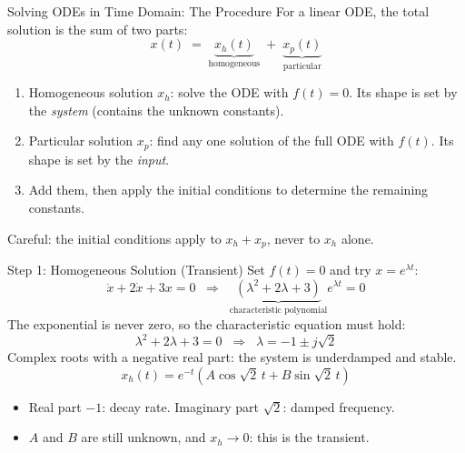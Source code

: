 \documentclass[12pt, aspectratio=169]{beamer}
\begin{document}
\begin{frame}{Solving ODEs in Time Domain: The Procedure}
    For a linear ODE, the total solution is the sum of two parts:
    \[
        x(t) \;=\; \underbrace{x_h(t)}_{\text{homogeneous}} \;+\; \underbrace{x_p(t)}_{\text{particular}}
    \]
    \begin{enumerate}
        \item \alert{Homogeneous solution} $x_h$: solve the ODE with $f(t) = 0$.
              Its shape is set by the \emph{system} (contains the unknown constants).
        \item \alert{Particular solution} $x_p$: find any one solution of the full ODE
              with $f(t)$. Its shape is set by the \emph{input}.
        \item Add them, then apply the \alert{initial conditions} to determine the
              remaining constants.
    \end{enumerate}
    \vspace{0.3em}
    \begin{center}
        \alert{Careful:} the initial conditions apply to $x_h + x_p$, never to $x_h$ alone.
    \end{center}
\end{frame}

\begin{frame}{Step 1: Homogeneous Solution (Transient)}
    Set $f(t) = 0$ and try $x = e^{\lambda t}$:
    \[
        \ddot{x} + 2\dot{x} + 3x = 0
        \;\;\Longrightarrow\;\;
        \underbrace{(\lambda^2 + 2\lambda + 3)}_{\text{characteristic polynomial}} e^{\lambda t} = 0
    \]
    The exponential is never zero, so the \alert{characteristic equation} must hold:
    \[
        \lambda^2 + 2\lambda + 3 = 0 \;\;\Longrightarrow\;\; \lambda = -1 \pm j\sqrt{2}
    \]
    Complex roots with a negative real part: the system is \alert{underdamped} and stable.
    \[
        x_h(t) = e^{-t}\left(A\cos\sqrt{2}\,t + B\sin\sqrt{2}\,t\right)
    \]
    \begin{itemize}
        \item Real part $-1$: decay rate. Imaginary part $\sqrt{2}$: damped frequency.
        \item $A$ and $B$ are still unknown, and $x_h \to 0$: this is the \alert{transient}.
    \end{itemize}
\end{frame}
\end{document}

